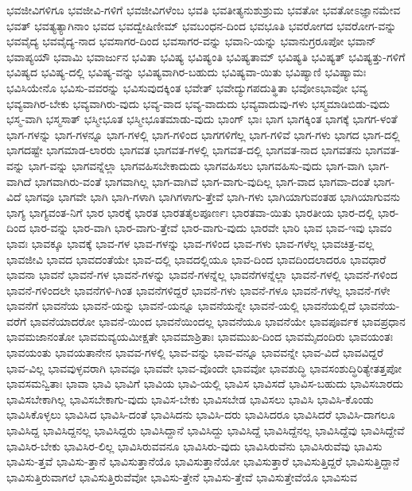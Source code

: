 {ಭವಜೀವಿಗಳಿಗೂ
ಭವಜೀವಿ-ಗಳಿಗೆ
ಭವಜೀವಿಗಳೆಂಬ
ಭವತಿ
ಭವತೀತ್ಯನುಶುಶ್ರುಮ
ಭವತೋ
ಭವತೋಽಜ್ಞಾನಮೇವ
ಭವತ್
ಭವತ್ಯತ್ಯಾಗಿನಾಂ
ಭವದ
ಭವದ್ವೇಷಿಣೀಮ್
ಭವಬಂಧನ-ದಿಂದ
ಭವಭೂತಿ
ಭವರೋಗದ
ಭವರೋಗ-ವನ್ನು
ಭವವೈದ್ಯ
ಭವವೈದ್ಯ-ನಾದ
ಭವಸಾಗರ-ದಿಂದ
ಭವಸಾಗರ-ವನ್ನು
ಭವಾನಿ-ಯನ್ನು
ಭವಾನುಗ್ರರೂಪೋ
ಭವಾನ್
ಭವಾಪ್ಯಯೌ
ಭವಾಮಿ
ಭವಾರ್ಜುನ
ಭವಿತಾ
ಭವಿಷ್ಯ
ಭವಿಷ್ಯಂತಿ
ಭವಿಷ್ಯತಾಮ್
ಭವಿಷ್ಯತಿ
ಭವಿಷ್ಯತ್
ಭವಿಷ್ಯತ್ತು-ಗಳಿಗೆ
ಭವಿಷ್ಯದ
ಭವಿಷ್ಯ-ದಲ್ಲಿ
ಭವಿಷ್ಯ-ವನ್ನು
ಭವಿಷ್ಯವಾಗಿರ-ಬಹುದು
ಭವಿಷ್ಯವಾ-ಯಿತು
ಭವಿಷ್ಯಾಣಿ
ಭವಿಷ್ಯಾಮಃ
ಭವಿಸಿಯೇನೊ
ಭವಿಸು-ವವರನ್ನು
ಭವಿಸುವುದಕ್ಕಿಂತ
ಭವೇತ್
ಭವೇದ್ಯುಗಪದುತ್ಥಿತಾ
ಭವೋಽಭಾವೋ
ಭವ್ಯ
ಭವ್ಯವಾಗಿರ-ಬೇಕು
ಭವ್ಯವಾಗಿರು-ವುದು
ಭವ್ಯ-ವಾದ
ಭವ್ಯ-ವಾದುದು
ಭವ್ಯವಾದುವು-ಗಳು
ಭಸ್ಮಮಾಡಿಬಿಡು-ವುದು
ಭಸ್ಮ-ವಾಗಿ
ಭಸ್ಮಸಾತ್
ಭಸ್ಮೀಭೂತ
ಭಸ್ಮೀಭೂತಮಾಡು-ವುದು
ಭಾಂಗ್
ಭಾಃ
ಭಾಗ
ಭಾಗಕ್ಕಿಂತ
ಭಾಗಕ್ಕೆ
ಭಾಗಗ-ಳಂತೆ
ಭಾಗ-ಗಳನ್ನು
ಭಾಗ-ಗಳನ್ನೂ
ಭಾಗ-ಗಳಲ್ಲಿ
ಭಾಗ-ಗಳಿಂದ
ಭಾಗಗಳಿಗೆಲ್ಲ
ಭಾಗ-ಗಳಿವೆ
ಭಾಗ-ಗಳು
ಭಾಗದ
ಭಾಗ-ದಲ್ಲಿ
ಭಾಗದಷ್ಟೇ
ಭಾಗಮಾಡ-ಲಾರರು
ಭಾಗವತ
ಭಾಗವತ-ಗಳಲ್ಲಿ
ಭಾಗವತ-ದಲ್ಲಿ
ಭಾಗವತ-ನಾದ
ಭಾಗವತನು
ಭಾಗವತ-ವನ್ನು
ಭಾಗ-ವನ್ನು
ಭಾಗವನ್ನೆಲ್ಲಾ
ಭಾಗವಹಿಸಬೇಕಾದುದು
ಭಾಗವಹಿಸಲು
ಭಾಗವಹಿಸು-ವುದು
ಭಾಗ-ವಾಗಿ
ಭಾಗ-ವಾಗಿದೆ
ಭಾಗವಾಗಿರು-ವಂತೆ
ಭಾಗವಾಗಿಲ್ಲ
ಭಾಗ-ವಾಗಿವೆ
ಭಾಗ-ವಾಗು-ವುದಿಲ್ಲ
ಭಾಗ-ವಾದ
ಭಾಗವಾ-ದಂತೆ
ಭಾಗ-ವಿದೆ
ಭಾಗವೂ
ಭಾಗವೇ
ಭಾಗಿ
ಭಾಗಿ-ಗಳಾಗಿ
ಭಾಗಿಗಳಾಗು-ತ್ತೇವೆ
ಭಾಗಿ-ಗಳು
ಭಾಗಿಯಾಗುವಂತಹ
ಭಾಗಿಯಾಗುವನು
ಭಾಗ್ಯ
ಭಾಗ್ಯವಂತ-ನಿಗೆ
ಭಾರ
ಭಾರಕ್ಕೆ
ಭಾರತ
ಭಾರತತೈಲಪೂರ್ಣಃ
ಭಾರತವಾ-ಯಿತು
ಭಾರತೀಯ
ಭಾರ-ದಲ್ಲಿ
ಭಾರ-ದಿಂದ
ಭಾರ-ವನ್ನು
ಭಾರ-ವಾಗಿ
ಭಾರ-ವಾಗು-ತ್ತೇವೆ
ಭಾರ-ವಾಗು-ವುದು
ಭಾರವೇ
ಭಾರಿ
ಭಾವ
ಭಾವ-ಇವು
ಭಾವಂ
ಭಾವಃ
ಭಾವಕ್ಕೂ
ಭಾವಕ್ಕೆ
ಭಾವ-ಗಳ
ಭಾವ-ಗಳನ್ನು
ಭಾವ-ಗಳಿಂದ
ಭಾವ-ಗಳು
ಭಾವ-ಗಳೆಲ್ಲ
ಭಾವಚಿತ್ರ-ವಲ್ಲ
ಭಾವಜೀವಿ
ಭಾವದ
ಭಾವದಂತೆಯೇ
ಭಾವ-ದಲ್ಲಿ
ಭಾವದಲ್ಲಿಯೂ
ಭಾವ-ದಿಂದ
ಭಾವದಿಂದಲಾದರೂ
ಭಾವಧಾರೆ
ಭಾವನಾ
ಭಾವನೆ
ಭಾವನೆ-ಗಳ
ಭಾವನೆ-ಗಳನ್ನು
ಭಾವನೆ-ಗಳನ್ನೆಲ್ಲ
ಭಾವನೆಗಳನ್ನೆಲ್ಲಾ
ಭಾವನೆ-ಗಳಲ್ಲಿ
ಭಾವನೆ-ಗಳಿಂದ
ಭಾವನೆ-ಗಳಿಂದಲೇ
ಭಾವನೆಗಳಿ-ಗಿಂತ
ಭಾವನೆಗಳಿದ್ದರೆ
ಭಾವನೆ-ಗಳು
ಭಾವನೆ-ಗಳೂ
ಭಾವನೆ-ಗಳೆಲ್ಲ
ಭಾವನೆ-ಗಳೇ
ಭಾವನೆಗೆ
ಭಾವನೆಯ
ಭಾವನೆ-ಯನ್ನು
ಭಾವನೆ-ಯನ್ನೂ
ಭಾವನೆಯನ್ನೇ
ಭಾವನೆ-ಯಲ್ಲಿ
ಭಾವನೆಯಲ್ಲಿದೆ
ಭಾವನೆಯ-ವರೆಗೆ
ಭಾವನೆಯಾದರೋ
ಭಾವನೆ-ಯಿಂದ
ಭಾವನೆಯಿಂದಲ್ಲ
ಭಾವನೆಯೂ
ಭಾವನೆಯೇ
ಭಾವಪೂರ್ವಕ
ಭಾವಪ್ರಧಾನ
ಭಾವಮಜಾನಂತೋ
ಭಾವಮವ್ಯಯಮೀಕ್ಷತೇ
ಭಾವಮಾಶ್ರಿತಾಃ
ಭಾವಮುಖ-ದಿಂದ
ಭಾವಮೈದಂದಿರು
ಭಾವಯಂತಃ
ಭಾವಯಂತು
ಭಾವಯತಾನೇನ
ಭಾವವ-ಗಳಲ್ಲಿ
ಭಾವ-ವನ್ನು
ಭಾವ-ವನ್ನೂ
ಭಾವವನ್ನೇ
ಭಾವ-ವಿದೆ
ಭಾವವಿದ್ದರೆ
ಭಾವ-ವಿಲ್ಲ
ಭಾವವುಳ್ಳವರಾಗಿ
ಭಾವವೂ
ಭಾವವೇ
ಭಾವ-ವೊಂದೇ
ಭಾವವೋ
ಭಾವಶುದ್ಧಿ
ಭಾವಸಂಶುದ್ಧಿರಿತ್ಯೇತತ್ತಪೋ
ಭಾವಸಮನ್ವಿತಾಃ
ಭಾವಾ
ಭಾವಿ
ಭಾವಿಗೆ
ಭಾವಿಯ
ಭಾವಿ-ಯಲ್ಲಿ
ಭಾವಿಸ
ಭಾವಿಸದೆ
ಭಾವಿಸ-ಬಹುದು
ಭಾವಿಸಬಾರದು
ಭಾವಿಸಬೇಕಾಗಿಲ್ಲ
ಭಾವಿಸಬೇಕಾಗು-ವುದು
ಭಾವಿಸ-ಬೇಕು
ಭಾವಿಸಬೇಡ
ಭಾವಿಸಲು
ಭಾವಿಸಿ
ಭಾವಿಸಿ-ಕೊಂಡು
ಭಾವಿಸಿಕೊಳ್ಳಲು
ಭಾವಿಸಿದ
ಭಾವಿಸಿ-ದಂತೆ
ಭಾವಿಸಿದನು
ಭಾವಿಸಿ-ದರು
ಭಾವಿಸಿದರೂ
ಭಾವಿಸಿದರೆ
ಭಾವಿಸಿ-ದಾಗಲೂ
ಭಾವಿಸಿದ್ದ
ಭಾವಿಸಿದ್ದನಲ್ಲ
ಭಾವಿಸಿದ್ದರು
ಭಾವಿಸಿದ್ದಾನೆ
ಭಾವಿಸಿದ್ದು
ಭಾವಿಸಿದ್ದೆ
ಭಾವಿಸಿದ್ದೆನಲ್ಲ
ಭಾವಿಸಿದ್ದೆವು
ಭಾವಿಸಿದ್ದೇವೆ
ಭಾವಿಸಿರ-ಬೇಕು
ಭಾವಿಸಿರ-ಲಿಲ್ಲ
ಭಾವಿಸಿರುವವನೂ
ಭಾವಿಸಿರು-ವುದು
ಭಾವಿಸಿರುವೆನು
ಭಾವಿಸಿರುವೆವು
ಭಾವಿಸು
ಭಾವಿಸು-ತ್ತವೆ
ಭಾವಿಸು-ತ್ತಾನೆ
ಭಾವಿಸುತ್ತಾನೆಯೊ
ಭಾವಿಸುತ್ತಾನೆಯೋ
ಭಾವಿಸುತ್ತಾರೆ
ಭಾವಿಸುತ್ತಿದ್ದರೆ
ಭಾವಿಸುತ್ತಿದ್ದಾನೆ
ಭಾವಿಸುತ್ತಿರುವಾಗಲೆ
ಭಾವಿಸುತ್ತಿರುವೆವೋ
ಭಾವಿಸು-ತ್ತೇನೆ
ಭಾವಿಸು-ತ್ತೇವೆ
ಭಾವಿಸುತ್ತೇವೆಯೊ
ಭಾವಿಸುವ
}

